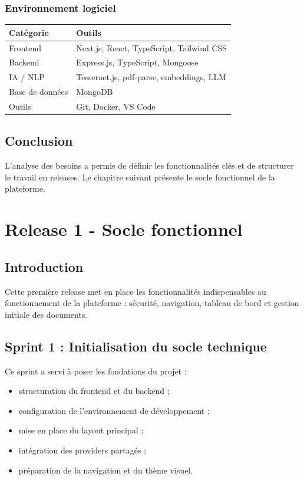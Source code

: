 \documentclass[12pt,a4paper]{report}
\begin{document}
\subsection{Environnement logiciel}

\begin{longtable}{>{\raggedright\arraybackslash}p{3.5cm} >{\raggedright\arraybackslash}p{10.0cm}}
\toprule
Catégorie & Outils \\
\midrule
Frontend & Next.js, React, TypeScript, Tailwind CSS \\
Backend & Express.js, TypeScript, Mongoose \\
IA / NLP & Tesseract.js, pdf-parse, embeddings, LLM \\
Base de données & MongoDB \\
Outils & Git, Docker, VS Code \\
\bottomrule
\end{longtable}

\section{Conclusion}
L'analyse des besoins a permis de définir les fonctionnalités clés et de structurer le travail en releases. Le chapitre suivant présente le socle fonctionnel de la plateforme.

\chapter{Release 1 - Socle fonctionnel}

\section{Introduction}
Cette première release met en place les fonctionnalités indispensables au fonctionnement de la plateforme : sécurité, navigation, tableau de bord et gestion initiale des documents.

\section{Sprint 1 : Initialisation du socle technique}
Ce sprint a servi à poser les fondations du projet :
\begin{itemize}
  \item structuration du frontend et du backend ;
  \item configuration de l'environnement de développement ;
  \item mise en place du layout principal ;
  \item intégration des providers partagés ;
  \item préparation de la navigation et du thème visuel.
\end{itemize}
\end{document}
